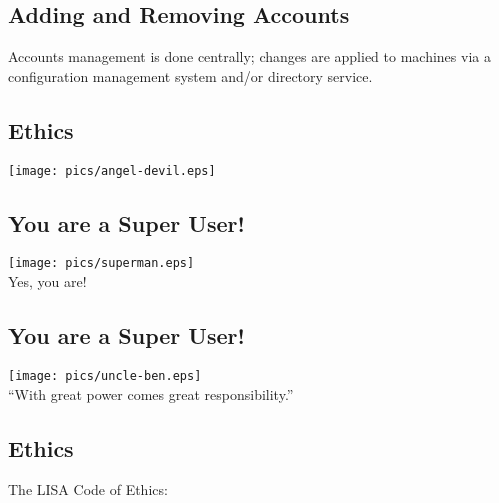 \documentclass[xga]{xdvislides}
\begin{document}
%
%
\subsection{Adding and Removing Accounts}
\vfill
%
Accounts management is done centrally; changes are applied to machines via a
configuration management system and/or directory service.
\vfill

\subsection{Ethics}
\begin{center}
	\texttt{[image: pics/angel-devil.eps]}
\end{center}

\subsection{You are a Super User!}
\begin{center}
	\texttt{[image: pics/superman.eps]} \\
	\small
	Yes, you are!
	\Normalsize
\end{center}

\subsection{You are a Super User!}
\begin{center}
	\texttt{[image: pics/uncle-ben.eps]} \\
	\addvspace{.2in}
	\Huge
	``With great power comes great responsibility.''
	\Normalsize
\end{center}


\subsection{Ethics}
The LISA Code of Ethics:
\\
\end{document}
